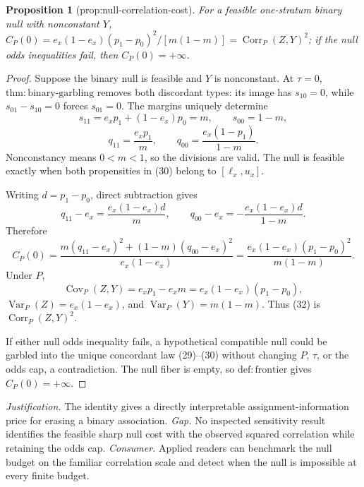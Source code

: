 \documentclass{article}
\newtheorem{proposition}{Proposition}
\begin{document}
\begin{proposition}[prop:null-correlation-cost]\label{prop:null-correlation-cost}
For a feasible one-stratum binary null with nonconstant \(Y\), \(C_P(0)=e_x(1-e_x)(p_1-p_0)^2/[m(1-m)]=\operatorname{Corr}_P(Z,Y)^2\); if the null odds inequalities fail, then \(C_P(0)=+\infty\).
\end{proposition}
\begin{proof}
Suppose the binary null is feasible and \(Y\) is nonconstant. At \(\tau=0\), \(\mathrm{thm{:}binary\mbox{-}garbling}\) removes both discordant types: its image has \(s_{10}=0\), while \(s_{01}-s_{10}=0\) forces \(s_{01}=0\). The margins uniquely determine
\[
s_{11}=e_xp_1+(1-e_x)p_0=m,\qquad s_{00}=1-m, \tag{29}
\]
\[
q_{11}=\frac{e_xp_1}{m},\qquad q_{00}=\frac{e_x(1-p_1)}{1-m}. \tag{30}
\]
Nonconstancy means \(0<m<1\), so the divisions are valid. The null is feasible exactly when both propensities in (30) belong to \([\ell_x,u_x]\).

Writing \(d=p_1-p_0\), direct subtraction gives
\[
q_{11}-e_x=\frac{e_x(1-e_x)d}{m},\qquad
q_{00}-e_x=-\frac{e_x(1-e_x)d}{1-m}. \tag{31}
\]
Therefore
\[
C_P(0)
=\frac{m(q_{11}-e_x)^2+(1-m)(q_{00}-e_x)^2}{e_x(1-e_x)}
=\frac{e_x(1-e_x)(p_1-p_0)^2}{m(1-m)}. \tag{32}
\]
Under \(P\),
\[
\operatorname{Cov}_P(Z,Y)=e_xp_1-e_xm=e_x(1-e_x)(p_1-p_0),
\]
\(\operatorname{Var}_P(Z)=e_x(1-e_x)\), and \(\operatorname{Var}_P(Y)=m(1-m)\). Thus (32) is \(\operatorname{Corr}_P(Z,Y)^2\).

If either null odds inequality fails, a hypothetical compatible null could be garbled into the unique concordant law (29)--(30) without changing \(P\), \(\tau\), or the odds cap, a contradiction. The null fiber is empty, so \(\mathrm{def{:}frontier}\) gives \(C_P(0)=+\infty\).
\end{proof}
\par\smallskip\noindent \textit{Justification.} The identity gives a directly interpretable assignment-information price for erasing a binary association. \textit{Gap.} No inspected sensitivity result identifies the feasible sharp null cost with the observed squared correlation while retaining the odds cap. \textit{Consumer.} Applied readers can benchmark the null budget on the familiar correlation scale and detect when the null is impossible at every finite budget.
\end{document}
